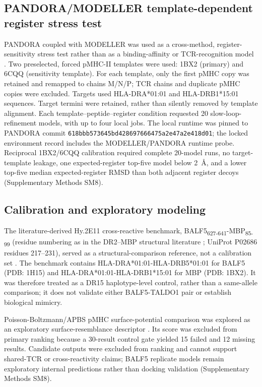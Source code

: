\documentclass[11pt]{article}
\newcommand{\pep}[2]{#1\textsubscript{#2}}
\begin{document}
\subsection{PANDORA/MODELLER template-dependent register stress test}
PANDORA coupled with MODELLER was used as a cross-method, register-sensitivity stress test rather than as a binding-affinity or TCR-recognition model \cite{pandora,modeller}. Two preselected, forced pMHC-II templates were used: 1BX2 (primary) and 6CQQ (sensitivity template). For each template, only the first pMHC copy was retained and remapped to chains M/N/P; TCR chains and duplicate pMHC copies were excluded. Targets used HLA-DRA*01:01 and HLA-DRB1*15:01 sequences. Target termini were retained, rather than silently removed by template alignment. Each template--peptide--register condition requested 20 slow-loop-refinement models, with up to four local jobs. The local runtime was pinned to PANDORA commit \texttt{618bbb573645bd428697666475a2e47a2e418d01}; the locked environment record includes the MODELLER/PANDORA runtime probe. Reciprocal 1BX2/6CQQ calibration required complete 20-model runs, no target-template leakage, one expected-register top-five model below 2~\AA{}, and a lower top-five median expected-register RMSD than both adjacent register decoys (Supplementary Methods SM8).

\subsection{Calibration and exploratory modeling}
The literature-derived Hy.2E11 cross-reactive benchmark, \pep{BALF5}{627-641}-\pep{MBP}{85-99} (residue numbering as in the DR2--MBP structural literature \cite{gauthier}; UniProt P02686 residues 217--231), served as a structural-comparison reference, not a calibration set \cite{lang}. The benchmark contains HLA-DRA*01:01-HLA-DRB5*01:01 for BALF5 (PDB: 1H15) and HLA-DRA*01:01-HLA-DRB1*15:01 for MBP (PDB: 1BX2). It was therefore treated as a DR15 haplotype-level control, rather than a same-allele comparison; it does not validate either BALF5-TALDO1 pair or establish biological mimicry.

Poisson-Boltzmann/APBS pMHC surface-potential comparison was explored as an exploratory surface-resemblance descriptor \cite{apbs}. Its score was excluded from primary ranking because a 30-result control gate yielded 15 failed and 12 missing results. Candidate outputs were excluded from ranking and cannot support shared-TCR or cross-reactivity claims; BALF5 replicate models remain exploratory internal predictions rather than docking validation (Supplementary Methods SM8).
\end{document}
